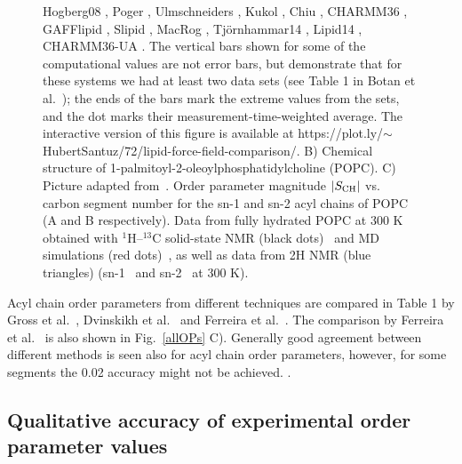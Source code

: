 \documentclass[aps,prl,superscriptaddress,twocolumn]{revtex4}
\begin{document}
\begin{figure}[]
{    Hogberg08 \cite{hogberg08},
    Poger \cite{poger10},
    Ulmschneiders \cite{ulmschneider09},
    Kukol \cite{kukol09},
    Chiu \cite{chiu09},
    CHARMM36 \cite{klauda10},
    GAFFlipid \cite{dickson12},
    Slipid \cite{jambeck12},
    MacRog \cite{maciejewski14},
    Tj{\"o}rnhammar14 \cite{tjornhammar14},
    Lipid14 \cite{dickson14},
    CHARMM36-UA \cite{lee14}. 
    The vertical bars shown for some of the computational values are not error bars, but demonstrate that for 
    these systems we had at least two data sets (see Table 1 in Botan et al.~\cite{botan15});
    the ends of the bars mark the extreme values from the sets, and the dot marks their measurement-time-weighted average. 
    The interactive version of this figure is available at  https://plot.ly/$\sim$HubertSantuz/72/lipid-force-field-comparison/.
    B) Chemical structure of 1-palmitoyl-2-oleoylphosphatidylcholine (POPC).
    C) Picture adapted from~\cite{ferreira13}.
    Order parameter magnitude $|S_{{\rm CH}}|$ vs. carbon segment number for the
    sn-1 and sn-2 acyl chains of POPC (A and B respectively). Data from fully hydrated POPC at
    300 K obtained with $^1$H–$^{13}$C solid-state NMR (black dots)~\cite{ferreira13} and MD simulations
    (red dots)~\cite{ferreira13}, as well as data from 2H NMR (blue triangles) (sn-1~\cite{seelig78} and
    sn-2~\cite{seelig78,perly85} at 300 K).
  }
\end{figure}

Acyl chain order parameters from different techniques are compared in Table 1 by Gross et al.~\cite{gross97}, 
Dvinskikh et al.~\cite{dvinskikh05a} and Ferreira et al.~\cite{ferreira13}. The comparison by Ferreira et al.~\cite{ferreira13} 
is also shown in Fig.~\ref{allOPs} C). Generally good agreement between different methods is seen also for
acyl chain order parameters, however, for some segments the 0.02 accuracy might not be achieved.
.



\subsection{Qualitative accuracy of experimental order parameter values}
\end{document}
